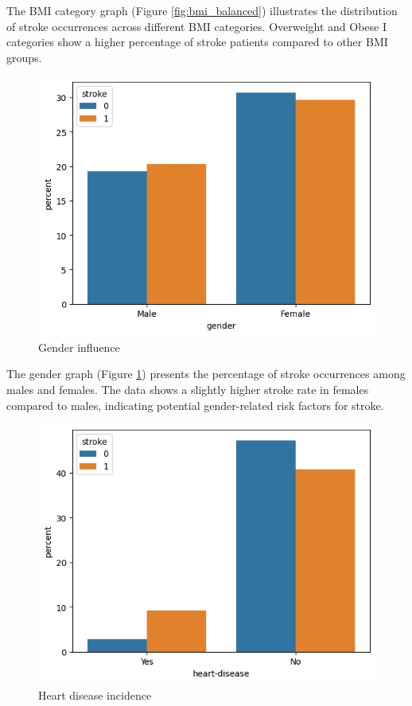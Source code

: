 \documentclass[twocolumn, 9pt]{extarticle}
\begin{document}
The BMI category graph (Figure \ref{fig:bmi_balanced}) illustrates the distribution of stroke occurrences across different BMI categories. Overweight and Obese I categories show a higher percentage of stroke patients compared to other BMI groups.

\begin{figure}[h]
\centering
\includegraphics[scale=0.4]{images/gender_graph.png}
\caption{Gender influence}
\label{fig:gender}
\end{figure}

The gender graph (Figure \ref{fig:gender}) presents the percentage of stroke occurrences among males and females. The data shows a slightly higher stroke rate in females compared to males, indicating potential gender-related risk factors for stroke.

\begin{figure}[h]
\centering
\includegraphics[scale=0.4]{images/heart_disease_graph.png}
\caption{Heart disease incidence}
\label{fig:heart}
\end{figure}
\end{document}

